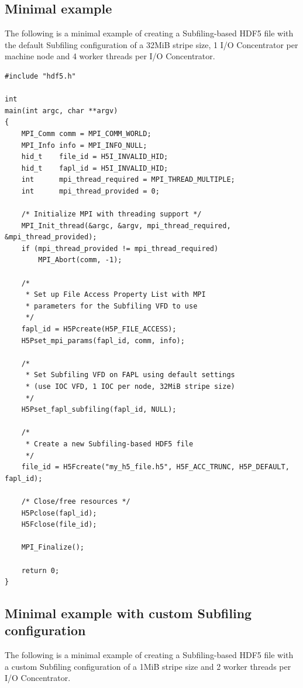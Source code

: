 \documentclass[../main.tex]{subfiles}
\begin{document}
\subsection{Minimal example}

The following is a minimal example of creating a Subfiling-based HDF5 file
with the default Subfiling configuration of a 32MiB stripe size, 1 I/O Concentrator
per machine node and 4 worker threads per I/O Concentrator. 

\label{ex:ex1}
\begin{verbatim}
#include "hdf5.h"

int
main(int argc, char **argv)
{
    MPI_Comm comm = MPI_COMM_WORLD;
    MPI_Info info = MPI_INFO_NULL;
    hid_t    file_id = H5I_INVALID_HID;
    hid_t    fapl_id = H5I_INVALID_HID;
    int      mpi_thread_required = MPI_THREAD_MULTIPLE;
    int      mpi_thread_provided = 0;

    /* Initialize MPI with threading support */
    MPI_Init_thread(&argc, &argv, mpi_thread_required, &mpi_thread_provided);
    if (mpi_thread_provided != mpi_thread_required)
        MPI_Abort(comm, -1);

    /*
     * Set up File Access Property List with MPI
     * parameters for the Subfiling VFD to use
     */
    fapl_id = H5Pcreate(H5P_FILE_ACCESS);
    H5Pset_mpi_params(fapl_id, comm, info);

    /*
     * Set Subfiling VFD on FAPL using default settings
     * (use IOC VFD, 1 IOC per node, 32MiB stripe size)
     */
    H5Pset_fapl_subfiling(fapl_id, NULL);
    
    /*
     * Create a new Subfiling-based HDF5 file
     */
    file_id = H5Fcreate("my_h5_file.h5", H5F_ACC_TRUNC, H5P_DEFAULT, fapl_id);

    /* Close/free resources */
    H5Pclose(fapl_id);
    H5Fclose(file_id);

    MPI_Finalize();

    return 0;
}
\end{verbatim}

\subsection{Minimal example with custom Subfiling configuration}

The following is a minimal example of creating a Subfiling-based HDF5 file
with a custom Subfiling configuration of a 1MiB stripe size and 2 worker
threads per I/O Concentrator.
\end{document}
